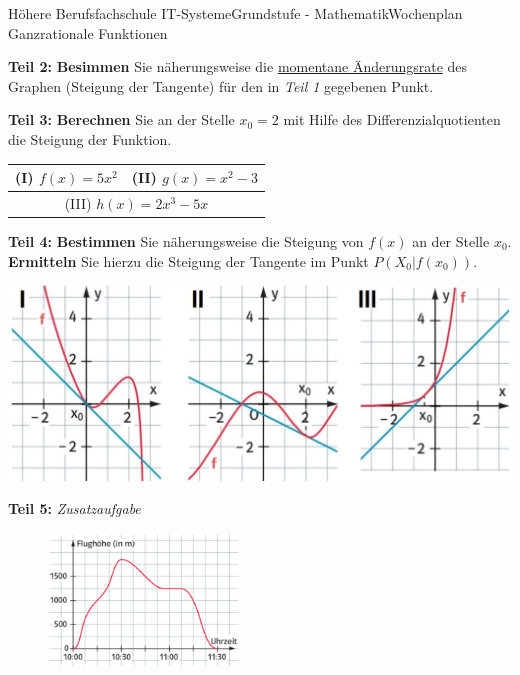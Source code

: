\documentclass[oneside,openany,headings=optiontotoc,11pt,numbers=noenddot]{scrreprt}
\begin{document}
\begin{worksheet}{Höhere Berufsfachschule IT-Systeme}{Grundstufe - Mathematik}{Wochenplan Ganzrationale Funktionen}
\begin{framed}
		\end{framed}
		\begin{framed}
			\noindent
			\textbf{Teil 2:} \textbf{Besimmen} Sie näherungsweise die \underline{momentane Änderungsrate} des Graphen (Steigung der Tangente) für den in \textit{Teil 1} gegebenen Punkt.
		\end{framed}
		\normalsize
		\begin{framed}
			\noindent
			\textbf{Teil 3:} \textbf{Berechnen} Sie an der Stelle \(x_0 = 2\) mit Hilfe des Differenzialquotienten die Steigung der Funktion.\\
			\renewcommand{\arraystretch}{2}
			\begin{tabularx}{\textwidth}{M|M}
				(I) \(f(x) = 5x^2\) & (II) \(g(x) = x^2 - 3\)\\
				\hline
				\multicolumn{2}{c}{(III) \(h(x) = 2x^3 -5x\)}
			\end{tabularx}
		\end{framed}
		\begin{framed}
			\noindent
			\textbf{Teil 4:} \textbf{Bestimmen} Sie näherungsweise die Steigung von \(f(x)\) an der Stelle \(x_0\). \textbf{Ermitteln} Sie hierzu die Steigung der Tangente im Punkt \(P(X_0|f(x_0))\).\\
			\par\noindent
			\includegraphics[width=\textwidth]{../99_Bilder/WP/WP13_T4.jpg}\\
		\end{framed}
		\begin{framed}
			\noindent
			\textbf{Teil 5:} \textit{Zusatzaufgabe}\\
			\begin{figure}
				\includegraphics[width=0.45\textwidth,align=b]{../99_Bilder/WP/WP13_T5.jpg}\\

\end{figure}
\end{framed}
\end{worksheet}
\end{document}
